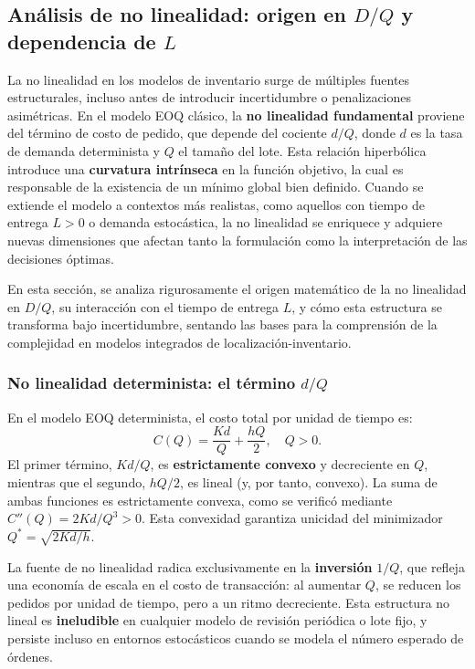 \documentclass[
  spanish,
  us-letterpaper,
  DIV=11,
  numbers=noendperiod]{scrreprt}
\numberwithin{equation}{section}
\begin{document}
\subsection{\texorpdfstring{Análisis de no linealidad: origen en \(D/Q\)
y dependencia de
\(L\)}{Análisis de no linealidad: origen en D/Q y dependencia de L}}\label{anuxe1lisis-de-no-linealidad-origen-en-dq-y-dependencia-de-l}

La no linealidad en los modelos de inventario surge de múltiples fuentes
estructurales, incluso antes de introducir incertidumbre o
penalizaciones asimétricas. En el modelo EOQ clásico, la \textbf{no
linealidad fundamental} proviene del término de costo de pedido, que
depende del cociente \(d/Q\), donde \(d\) es la tasa de demanda
determinista y \(Q\) el tamaño del lote. Esta relación hiperbólica
introduce una \textbf{curvatura intrínseca} en la función objetivo, la
cual es responsable de la existencia de un mínimo global bien definido.
Cuando se extiende el modelo a contextos más realistas, como aquellos
con tiempo de entrega \(L > 0\) o demanda estocástica, la no linealidad
se enriquece y adquiere nuevas dimensiones que afectan tanto la
formulación como la interpretación de las decisiones óptimas.

En esta sección, se analiza rigurosamente el origen matemático de la no
linealidad en \(D/Q\), su interacción con el tiempo de entrega \(L\), y
cómo esta estructura se transforma bajo incertidumbre, sentando las
bases para la comprensión de la complejidad en modelos integrados de
localización-inventario.

\subsubsection{\texorpdfstring{No linealidad determinista: el término
\(d/Q\)}{No linealidad determinista: el término d/Q}}\label{no-linealidad-determinista-el-tuxe9rmino-dq}

En el modelo EOQ determinista, el costo total por unidad de tiempo es:
\[
C(Q) = \frac{K d}{Q} + \frac{h Q}{2}, \quad Q > 0.
\] El primer término, \(K d / Q\), es \textbf{estrictamente convexo} y
decreciente en \(Q\), mientras que el segundo, \(h Q / 2\), es lineal
(y, por tanto, convexo). La suma de ambas funciones es estrictamente
convexa, como se verificó mediante \(C''(Q) = 2 K d / Q^3 > 0\). Esta
convexidad garantiza unicidad del minimizador
\(Q^* = \sqrt{2 K d / h}\).

La fuente de no linealidad radica exclusivamente en la
\textbf{inversión} \(1/Q\), que refleja una economía de escala en el
costo de transacción: al aumentar \(Q\), se reducen los pedidos por
unidad de tiempo, pero a un ritmo decreciente. Esta estructura no lineal
es \textbf{ineludible} en cualquier modelo de revisión periódica o lote
fijo, y persiste incluso en entornos estocásticos cuando se modela el
número esperado de órdenes.
\end{document}
